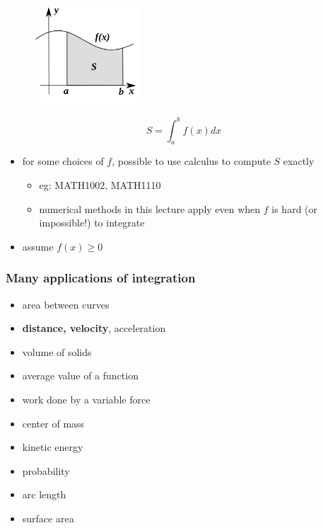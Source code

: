 \documentclass[english,14pt]{beamer}
\begin{document}

\begin{frame}[fragile]

\frametitle{}

\vspace*{-4mm}
\begin{figure}[ht]
	\centering
	\includegraphics[width=0.35\textwidth]{figures/integralArea}
\end{figure}
\vspace*{-3mm}
\[
\boxed{S = \int_a^b f(x) dx}
\]
\vspace*{-3mm}
\begin{itemize}
	\item for some choices of $f$, possible to use calculus to compute $S$ exactly
	\begin{itemize}
		\item eg: MATH1002, MATH1110
		\item numerical methods in this lecture apply even when $f$ is hard (or impossible!) to integrate
	\end{itemize}
	\item assume $f(x) \geq 0$
\end{itemize}

\end{frame}


\begin{frame}[fragile]

\frametitle{Many applications of integration}


\begin{itemize}
	\item area between curves
	\item \textbf{distance, velocity}, acceleration
	\item volume of solids
	\item average value of a function
	\item work done by a variable force
	\item center of mass
	\item kinetic energy
	\item probability
	\item arc length
	\item surface area
\end{itemize}

\end{frame}
\end{document}
